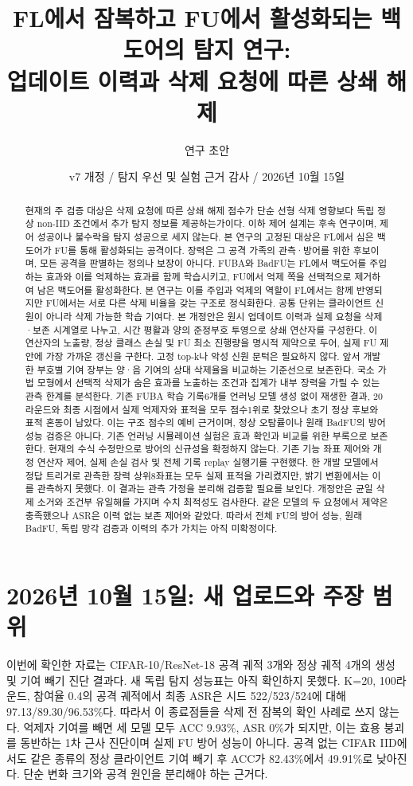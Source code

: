 \documentclass[10pt,a4paper]{article}
\title{FL에서 잠복하고 FU에서 활성화되는 백도어의 탐지 연구:\\업데이트 이력과 삭제 요청에 따른 상쇄 해제}
\author{연구 초안}
\date{v7 개정 / 탐지 우선 및 실험 근거 감사 / 2026년 10월 15일}
\begin{document}
\maketitle

\begin{abstract}
현재의 주 검증 대상은 삭제 요청에 따른 상쇄 해제 점수가 단순 선형 삭제 영향보다
독립 정상 non-IID 조건에서 추가 탐지 정보를 제공하는가이다.
이하 제어 설계는 후속 연구이며, 제어 성공이나 불수락을 탐지 성공으로 세지 않는다.
본 연구의 고정된 대상은 FL에서 심은 백도어가 FU를 통해 활성화되는 공격이다.
장력은 그 공격 가족의 관측·방어를 위한 후보이며, 모든 공격을 판별하는 정의나 보장이 아니다.
FUBA와 BadFU는 FL에서 백도어를 주입하는 효과와 이를 억제하는 효과를 함께 학습시키고,
FU에서 억제 쪽을 선택적으로 제거하여 남은 백도어를 활성화한다.
본 연구는 이를 주입과 억제의 역할이 FL에서는 함께 반영되지만 FU에서는 서로 다른 삭제 비율을
갖는 구조로 정식화한다. 공통 단위는 클라이언트 신원이 아니라 삭제 가능한 학습 기여다.
본 개정안은 원시 업데이트 이력과 실제 요청을 삭제·보존 시계열로 나누고,
시간 평활과 양의 준정부호 투영으로 상쇄 연산자를 구성한다.
이 연산자의 노출량, 정상 클래스 손실 및 FU 최소 진행량을 명시적 제약으로 두어,
실제 FU 제안에 가장 가까운 갱신을 구한다. 고정 top-k나 악성 신원 문턱은 필요하지 않다.
앞서 개발한 부호별 기여 장부는 양·음 기여의 상대 삭제율을 비교하는 기준선으로 보존한다.
국소 가법 모형에서 선택적 삭제가 숨은 효과를 노출하는 조건과
집계가 내부 장력을 가릴 수 있는 관측 한계를 분석한다.
기존 FUBA 학습 기록6개를 언러닝 모델 생성 없이 재생한 결과,
20라운드와 최종 시점에서 실제 억제자와 표적을 모두 점수1위로 찾았으나
초기 정상 후보와 표적 혼동이 남았다.
이는 구조 점수의 예비 근거이며, 정상 오탐률이나 원래 BadFU의 방어 성능 검증은 아니다.
기존 언러닝 시뮬레이션 실험은 효과 확인과 비교를 위한 부록으로 보존한다.
현재의 수식 수정만으로 방어의 신규성을 확정하지 않는다.
기존 기능 좌표 제어와 개정 연산자 제어, 실제 손실 검사 및 전체 기록 replay 실행기를 구현했다.
한 개발 모델에서 정답 트리거로 관측한 장력 상위8좌표는 모두 실제 표적을 가리켰지만,
밝기 변환에서는 이를 관측하지 못했다. 이 결과는 관측 가정을 분리해 검증할 필요를 보인다.
개정안은 균일 삭제 소거와 조건부 유일해를 가지며 수치 최적성도 검사한다.
같은 모델의 두 요청에서 제약은 충족했으나 ASR은 이력 없는 보존 제어와 같았다.
따라서 전체 FU의 방어 성능, 원래 BadFU, 독립 망각 검증과 이력의 추가 가치는 아직 미확정이다.
\end{abstract}

\section*{2026년 10월 15일: 새 업로드와 주장 범위}
이번에 확인한 자료는 CIFAR-10/ResNet-18 공격 궤적 3개와 정상 궤적 4개의
생성 및 기여 빼기 진단 결과다. 새 독립 탐지 성능표는 아직 확인하지 못했다.
K=20, 100라운드, 참여율 0.4의 공격 궤적에서 최종 ASR은 시드 522/523/524에 대해
97.13/89.30/96.53\%다. 따라서 이 종료점들을 삭제 전 잠복의 확인 사례로 쓰지 않는다.
억제자 기여를 빼면 세 모델 모두 ACC 9.93\%, ASR 0\%가 되지만,
이는 효용 붕괴를 동반하는 1차 근사 진단이며 실제 FU 방어 성능이 아니다.
공격 없는 CIFAR IID에서도 같은 종류의 정상 클라이언트 기여 빼기 후
ACC가 82.43\%에서 49.91\%로 낮아진다.
단순 변화 크기와 공격 원인을 분리해야 하는 근거다.
\end{document}
